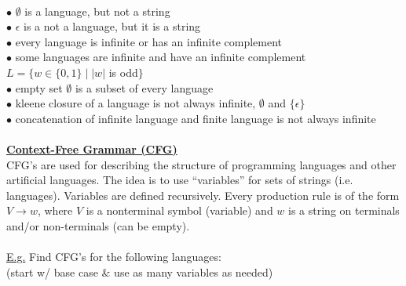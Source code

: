 \documentclass[8pt,letterpaper,twocolumn]{article}
\begin{document}
\\
$\bullet$ $\emptyset$ is a language, but not a string\\
$\bullet$ $\epsilon$ is a not a language, but it is a string\\
$\bullet$ every language is infinite or has an infinite complement\\
$\bullet$ some languages are infinite and have an infinite complement
$L = \{w \in \{0,1\} \mid |w|$ is odd$\}$\\
$\bullet$ empty set $\emptyset$ is a subset of every language\\
$\bullet$ kleene closure of a language is not always infinite, $\emptyset$ and $\{\epsilon\}$\\
$\bullet$ concatenation of infinite language and finite language is not always infinite\\
\\
\underline{\textbf{Context-Free Grammar (CFG)}} \\
CFG's are used for describing the structure of programming languages and other artificial languages.
The idea is to use ``variables'' for sets of strings (i.e. languages). Variables are defined
recursively. Every production rule is of the form $V \rightarrow w$, where $V$ is a nonterminal
symbol (variable) and $w$ is a string on terminals and/or non-terminals (can be empty). \\
\\
\underline{E.g.}
Find CFG's for the following languages: \\
(start w/ base case \& use as many variables as needed)
\end{document}
